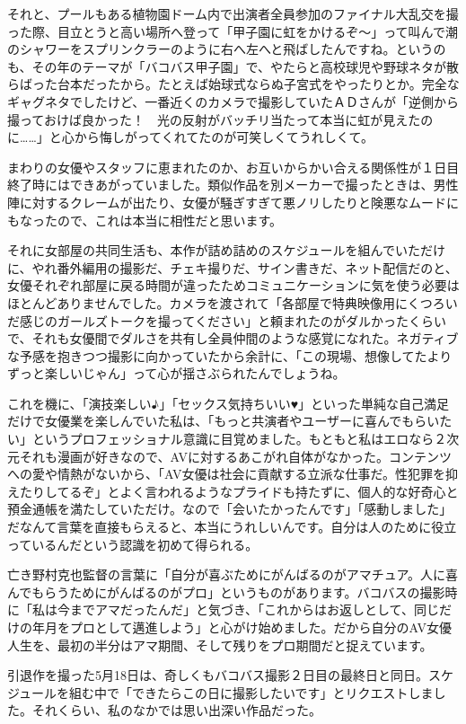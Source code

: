\documentclass[12pt,UTF8]{ctexbook}
\begin{document}
それと、プールもある植物園ドーム内で出演者全員参加のファイナル大乱交を撮った際、目立とうと高い場所へ登って「甲子園に虹をかけるぞ〜」って叫んで潮のシャワーをスプリンクラーのように右へ左へと飛ばしたんですね。というのも、その年のテーマが「バコバス甲子園」で、やたらと高校球児や野球ネタが散らばった台本だったから。たとえば始球式ならぬ子宮式をやったりとか。完全なギャグネタでしたけど、一番近くのカメラで撮影していたＡＤさんが「逆側から撮っておけば良かった！　光の反射がバッチリ当たって本当に虹が見えたのに……」と心から悔しがってくれてたのが可笑しくてうれしくて。

まわりの女優やスタッフに恵まれたのか、お互いからかい合える関係性が１日目終了時にはできあがっていました。類似作品を別メーカーで撮ったときは、男性陣に対するクレームが出たり、女優が騒ぎすぎて悪ノリしたりと険悪なムードにもなったので、これは本当に相性だと思います。

それに女部屋の共同生活も、本作が詰め詰めのスケジュールを組んでいただけに、やれ番外編用の撮影だ、チェキ撮りだ、サイン書きだ、ネット配信だのと、女優それぞれ部屋に戻る時間が違ったためコミュニケーションに気を使う必要はほとんどありませんでした。カメラを渡されて「各部屋で特典映像用にくつろいだ感じのガールズトークを撮ってください」と頼まれたのがダルかったくらいで、それも女優間でダルさを共有し全員仲間のような感覚になれた。ネガティブな予感を抱きつつ撮影に向かっていたから余計に、「この現場、想像してたよりずっと楽しいじゃん」って心が揺さぶられたんでしょうね。

これを機に、「演技楽しい♪」「セックス気持ちいい♥」といった単純な自己満足だけで女優業を楽しんでいた私は、「もっと共演者やユーザーに喜んでもらいたい」というプロフェッショナル意識に目覚めました。もともと私はエロなら２次元それも漫画が好きなので、AVに対するあこがれ自体がなかった。コンテンツへの愛や情熱がないから、「AV女優は社会に貢献する立派な仕事だ。性犯罪を抑えたりしてるぞ」とよく言われるようなプライドも持たずに、個人的な好奇心と預金通帳を満たしていただけ。なので「会いたかったんです」「感動しました」だなんて言葉を直接もらえると、本当にうれしいんです。自分は人のために役立っているんだという認識を初めて得られる。

亡き野村克也監督の言葉に「自分が喜ぶためにがんばるのがアマチュア。人に喜んでもらうためにがんばるのがプロ」というものがあります。バコバスの撮影時に「私は今までアマだったんだ」と気づき、「これからはお返しとして、同じだけの年月をプロとして邁進しよう」と心がけ始めました。だから自分のAV女優人生を、最初の半分はアマ期間、そして残りをプロ期間だと捉えています。

引退作を撮った5月18日は、奇しくもバコバス撮影２日目の最終日と同日。スケジュールを組む中で「できたらこの日に撮影したいです」とリクエストしました。それくらい、私のなかでは思い出深い作品だった。
\end{document}
